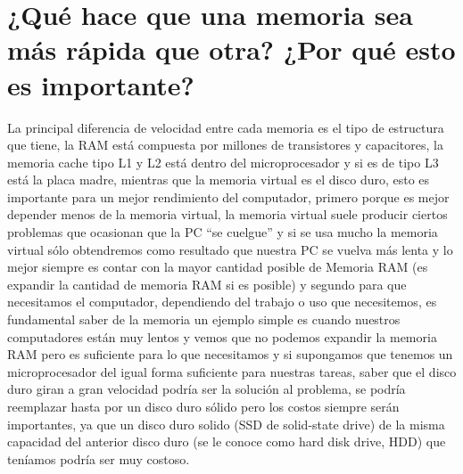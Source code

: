 \documentclass{article}
\begin{document}
\section{¿Qué hace que una memoria sea más rápida que otra? ¿Por qué esto es importante?}
La principal diferencia de velocidad entre cada memoria es el tipo de estructura que tiene, la RAM está compuesta por millones de transistores y capacitores, la memoria cache tipo L1 y L2 está dentro del microprocesador y si es de tipo L3 está la placa madre, mientras que la memoria virtual es el disco duro, esto es importante para un mejor rendimiento del computador, primero porque es mejor depender menos de la memoria virtual, la memoria virtual suele producir ciertos problemas que ocasionan que la PC “se cuelgue” y si se usa mucho la memoria virtual sólo obtendremos como resultado que nuestra PC se vuelva más lenta \cite{Venturini} y lo mejor siempre es contar con la mayor cantidad posible de Memoria RAM (es expandir la cantidad de memoria RAM si es posible) y segundo para que necesitamos el computador, dependiendo del trabajo o uso que necesitemos, es fundamental saber de la memoria un ejemplo simple es cuando nuestros computadores están muy lentos y vemos que no podemos expandir la memoria RAM pero es suficiente para lo que necesitamos y si supongamos que tenemos un microprocesador del igual forma suficiente para nuestras tareas, saber que el disco duro giran a gran velocidad podría ser la solución al problema, se podría reemplazar hasta por un disco duro sólido pero los costos siempre serán importantes, ya que un disco duro solido (SSD de solid-state drive) de la misma capacidad del anterior disco duro (se le conoce como hard disk drive, HDD) que teníamos podría ser muy costoso.





\end{document}

